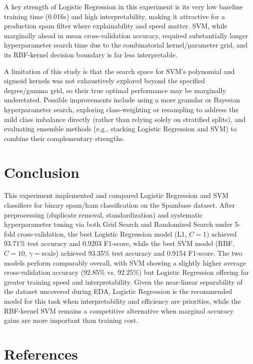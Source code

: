 \documentclass[12pt,a4paper]{article}
\begin{document}
A key strength of Logistic Regression in this experiment is its very low baseline training time (0.016s) and high interpretability, making it attractive for a production spam filter where explainability and speed matter. SVM, while marginally ahead in mean cross-validation accuracy, required substantially longer hyperparameter search time due to the combinatorial kernel/parameter grid, and its RBF-kernel decision boundary is far less interpretable.

A limitation of this study is that the search space for SVM's polynomial and sigmoid kernels was not exhaustively explored beyond the specified degree/gamma grid, so their true optimal performance may be marginally understated. Possible improvements include using a more granular or Bayesian hyperparameter search, exploring class-weighting or resampling to address the mild class imbalance directly (rather than relying solely on stratified splits), and evaluating ensemble methods (e.g., stacking Logistic Regression and SVM) to combine their complementary strengths.

\section{Conclusion}

This experiment implemented and compared Logistic Regression and SVM classifiers for binary spam/ham classification on the Spambase dataset. After preprocessing (duplicate removal, standardization) and systematic hyperparameter tuning via both Grid Search and Randomized Search under 5-fold cross-validation, the best Logistic Regression model (L1, $C{=}1$) achieved 93.71\% test accuracy and 0.9203 F1-score, while the best SVM model (RBF, $C{=}10$, $\gamma{=}$scale) achieved 93.35\% test accuracy and 0.9154 F1-score. The two models perform comparably overall, with SVM showing a slightly higher average cross-validation accuracy (92.85\% vs. 92.25\%) but Logistic Regression offering far greater training speed and interpretability. Given the near-linear separability of the dataset uncovered during EDA, Logistic Regression is the recommended model for this task when interpretability and efficiency are priorities, while the RBF-kernel SVM remains a competitive alternative when marginal accuracy gains are more important than training cost.

\section{References}
\end{document}
